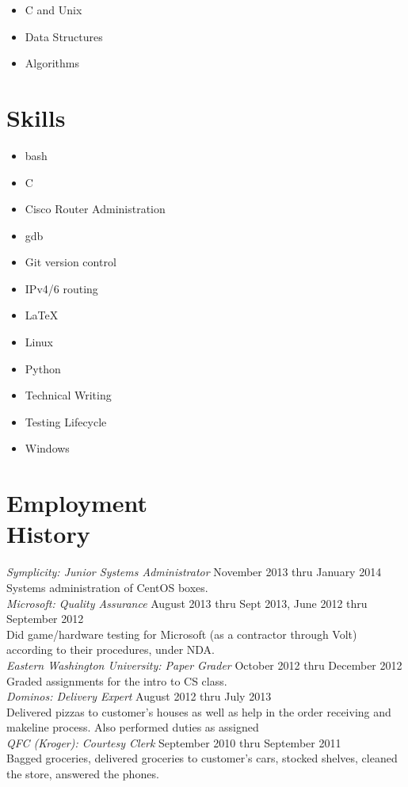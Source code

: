 \documentclass[line, margin]{res}
\begin{document}
\begin{resume}
	\begin{multicols}{3}
		\begin{itemize}
			\item C and Unix
			\item Data Structures
			\item Algorithms
		\end{itemize}
	\end{multicols}

	\section{Skills}
	\begin{multicols}{3}
		\begin{itemize}
			\item bash
			\item C
			\item Cisco Router Administration
			\item gdb
			\item Git version control
			\item IPv4/6 routing
			\item \LaTeX
			\item Linux
			\item Python
			\item Technical Writing
			\item Testing Lifecycle
			\item Windows
		\end{itemize}
	\end{multicols}

	\section{Employment\\History}
	\textit{Symplicity: Junior Systems Administrator} \hfill November 2013 thru January 2014 \\
	Systems administration of CentOS boxes. \\
	\textit{Microsoft: Quality Assurance} \hfill August 2013 thru Sept 2013, June 2012 thru September 2012 \\
	Did game/hardware testing for Microsoft (as a contractor through Volt) according to their procedures, under NDA. \\ [6pt]
	\textit{Eastern Washington University: Paper Grader} \hfill October 2012 thru December 2012 \\
	Graded assignments for the intro to CS class. \\ [6pt]

	\textit{Dominos: Delivery Expert} \hfill August 2012 thru July 2013 \\
	Delivered pizzas to customer's houses as well as help in the order
	receiving and makeline process. Also performed duties as assigned \\ [6pt]
	\textit{QFC (Kroger): Courtesy Clerk} \hfill September 2010 thru September 2011 \\
	Bagged groceries, delivered groceries to customer's cars, stocked
	shelves, cleaned the store, answered the phones. \\ 

\end{resume}
\end{document}
